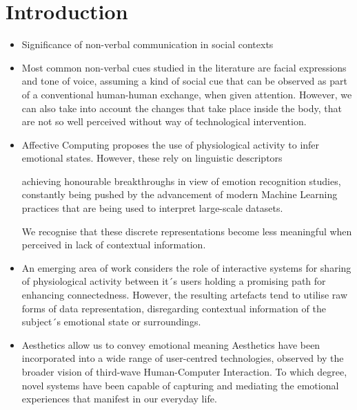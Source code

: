 

\chapter{Introduction}
\label{sec:objectives}

\begin{itemize}
  \item Significance of non-verbal communication in social contexts
  
  \item Most common non-verbal cues studied in the literature are facial expressions and tone of voice, assuming a kind of social cue that can be observed as part of a conventional human-human exchange, when given attention. However, we can also take into account the changes that take place inside the body, that are not so well perceived without way of technological intervention.
  
  \item Affective Computing proposes the use of physiological activity to infer emotional states. However, these rely on linguistic descriptors
  
  achieving honourable breakthroughs in view of emotion recognition studies, constantly being pushed by the advancement of modern Machine Learning practices that are being used to interpret large-scale datasets. 
  
  We recognise that these discrete representations become less meaningful when perceived in lack of contextual information.
  
  \item An emerging area of work considers the role of interactive systems for sharing of physiological activity  between it´s users holding a promising path for enhancing connectedness. However, the resulting artefacts tend to utilise raw forms of data representation, disregarding contextual information of the subject´s emotional state or surroundings.
  
  \item Aesthetics allow us to convey emotional meaning
  Aesthetics have been incorporated into a wide range of user-centred technologies, observed by the broader vision of third-wave Human-Computer Interaction. To which degree, novel systems have been capable of capturing and mediating the emotional experiences that manifest in our everyday life.  
\end{itemize}

